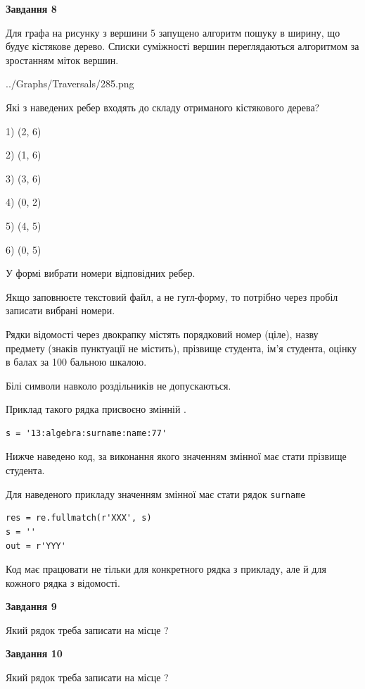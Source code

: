 \documentclass[12pt, ukrainian]{article}
\def\code#1{\Verb!#1!}
\begin{document}
{\begin {large}
{\begin {center}\textbf{Завдання 8}\end {center}}\par
Для графа на рисунку з вершини 5 запущено алгоритм пошуку в ширину, що будує кістякове дерево. Списки суміжності вершин переглядаються алгоритмом за зростанням міток вершин.\par
\begin{center}
	{../Graphs/Traversals/285.png}
\end{center}
\par Які з наведених ребер входять до складу отриманого кістякового дерева?\par
1) (2, 6)\par
2) (1, 6)\par
3) (3, 6)\par
4) (0, 2)\par
5) (4, 5)\par
6) (0, 5)\par
{\vskip 15pt} У формі вибрати номери відповідних ребер.


Якщо заповнюєте текстовий файл, а не гугл-форму, то потрібно через пробіл записа\-ти вибрані номери.\par
\newpage


Рядки відомості через двокрапку містять порядковий номер (ціле), назву предмету (знаків пунктуації не містить), прізвище студента, ім'я студента, оцінку в балах за 100 бальною шкалою.

Білі символи навколо роздільників не допускаються.

Приклад такого рядка присвоєно змінній .



\begin{verbatim}
s = '13:algebra:surname:name:77'
\end{verbatim}


Нижче наведено код, за виконання якого значенням змінної  має стати прізвище студента.

Для наведеного прикладу значенням змінної  має стати рядок \code{surname}



\begin{verbatim}
res = re.fullmatch(r'XXX', s)
s = ''
out = r'YYY'
\end{verbatim}


Код має працювати не тільки для конкретного рядка з прикладу, але й для кожного рядка з відомості.

{\begin {center}\textbf{Завдання 9}\end {center}}\par
Який рядок треба записати на місце  ?\par
\vspace{5mm}


{\begin {center}\textbf{Завдання 10}\end {center}}\par
Який рядок треба записати на місце  ?\par


\newpage


\end {large}}
\end{document}
